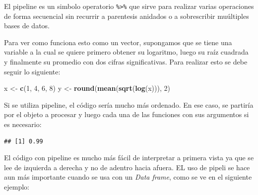 \documentclass[]{book}
\newenvironment{Shaded}{\begin{snugshade}}{\end{snugshade}}
\newcommand{\DecValTok}[1]{\textcolor[rgb]{0.00,0.00,0.81}{#1}}
\newcommand{\KeywordTok}[1]{\textcolor[rgb]{0.13,0.29,0.53}{\textbf{#1}}}
\newcommand{\NormalTok}[1]{#1}
\newcommand{\OperatorTok}[1]{\textcolor[rgb]{0.81,0.36,0.00}{\textbf{#1}}}
\newcommand{\StringTok}[1]{\textcolor[rgb]{0.31,0.60,0.02}{#1}}
\begin{document}
El pipeline es un simbolo operatorio \texttt{\%\textgreater{}\%} que
sirve para realizar varias operaciones de forma secuencial sin recurrir
a parentesis anidados o a sobrescribir muúltiples bases de datos.

Para ver como funciona esto como un vector, supongamos que se tiene una
variable a la cual se quiere primero obtener su logaritmo, luego su raíz
cuadrada y finalmente su promedio con dos cifras significativas. Para
realizar esto se debe seguir lo siguiente:

\begin{Shaded}
\begin{Highlighting}[]
\NormalTok{x <-}\StringTok{ }\KeywordTok{c}\NormalTok{(}\DecValTok{1}\NormalTok{, }\DecValTok{4}\NormalTok{, }\DecValTok{6}\NormalTok{, }\DecValTok{8}\NormalTok{)}
\NormalTok{y <-}\StringTok{ }\KeywordTok{round}\NormalTok{(}\KeywordTok{mean}\NormalTok{(}\KeywordTok{sqrt}\NormalTok{(}\KeywordTok{log}\NormalTok{(x))), }\DecValTok{2}\NormalTok{)}
\end{Highlighting}
\end{Shaded}

Si se utiliza pipeline, el código sería mucho más ordenado. En ese caso,
se partiría por el objeto a procesar y luego cada una de las funciones
con sus argumentos si es necesario:

\begin{Shaded}
\end{Shaded}

\begin{verbatim}
## [1] 0.99
\end{verbatim}

El código con pipeline es mucho más fácil de interpretar a primera vista
ya que se lee de izquierda a derecha y no de adentro hacia afuera. EL
uso de pipeli se hace aun más importante cuando se usa con un \emph{Data
frame}, como se ve en el siguiente ejemplo:
\end{document}
